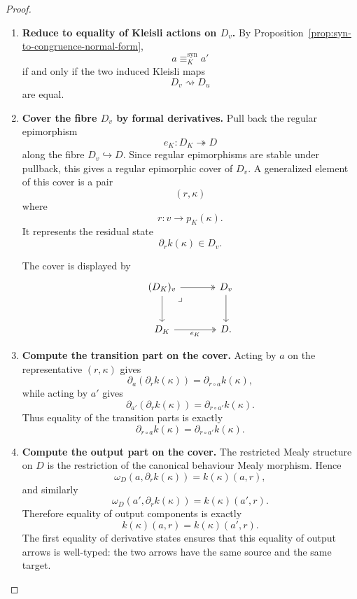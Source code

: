 \begin{proof}
    \leavevmode
    \begin{enumerate}
        \item \textbf{Reduce to equality of Kleisli actions on \(D_v\).}
        By Proposition~\ref{prop:syn-to-congruence-normal-form},
        \[
            a\equiv_K^{\mathrm{syn}}a'
        \]
        if and only if the two induced Kleisli maps
        \[
            D_v\rightsquigarrow D_u
        \]
        are equal.

        \item \textbf{Cover the fibre \(D_v\) by formal derivatives.}
        Pull back the regular epimorphism
        \[
            e_K:D_K\twoheadrightarrow D
        \]
        along the fibre \(D_v\hookrightarrow D\). Since regular epimorphisms are
        stable under pullback, this gives a regular epimorphic cover of \(D_v\).
        A generalized element of this cover is a pair
        \[
            (r,\kappa)
        \]
        where
        \[
            r:v\to p_K(\kappa).
        \]
        It represents the residual state
        \[
            \partial_r k(\kappa)\in D_v.
        \]

        The cover is displayed by
        \[
        \begin{tikzcd}[column sep=large, row sep=large]
            (D_K)_v
                \arrow[r, two heads]
                \arrow[d]
                \arrow[dr, phantom, "\lrcorner", very near start]
            &
            D_v
                \arrow[d]
            \\
            D_K
                \arrow[r, two heads, "e_K"']
            &
            D .
        \end{tikzcd}
        \]

        \item \textbf{Compute the transition part on the cover.}
        Acting by \(a\) on the representative \((r,\kappa)\) gives
        \[
            \partial_a(\partial_r k(\kappa))
            =
            \partial_{r\circ a}k(\kappa),
        \]
        while acting by \(a'\) gives
        \[
            \partial_{a'}(\partial_r k(\kappa))
            =
            \partial_{r\circ a'}k(\kappa).
        \]
        Thus equality of the transition parts is exactly
        \[
            \partial_{r\circ a}k(\kappa)
            =
            \partial_{r\circ a'}k(\kappa).
        \]

        \item \textbf{Compute the output part on the cover.}
        The restricted Mealy structure on \(D\) is the restriction of the
        canonical behaviour Mealy morphism. Hence
        \[
            \omega_D(a,\partial_r k(\kappa))
            =
            k(\kappa)(a,r),
        \]
        and similarly
        \[
            \omega_D(a',\partial_r k(\kappa))
            =
            k(\kappa)(a',r).
        \]
        Therefore equality of output components is exactly
        \[
            k(\kappa)(a,r)=k(\kappa)(a',r).
        \]
        The first equality of derivative states ensures that this equality of
        output arrows is well-typed: the two arrows have the same source and the
        same target.


\end{enumerate}
\end{proof}
